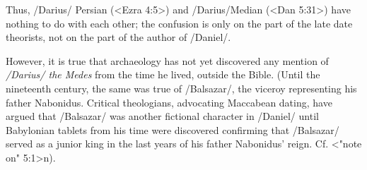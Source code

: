 %
%
%

Thus, \x/Darius/ Persian (<Ezra 4:5>) and \x/Darius/Median (<Dan 5:31>) have nothing to do with each other; the confusion is only on the part of the late date theorists, not on the part of the author of \x/Daniel/.

However, it is true that archaeology has not yet discovered any mention of {\it \x/Darius/ the Medes} from the time he lived, outside the Bible.
(Until the nineteenth century, the same was true of \x/Balsazar/, the viceroy representing his father Nabonidus. Critical theologians, advocating Maccabean dating, have argued that
\x/Balsazar/ was another fictional character in \x/Daniel/ until Babylonian tablets from his time were discovered confirming that \x/Balsazar/ served as a junior king in the last years of his father Nabonidus' reign. Cf. <"note on" 5:1>n).

